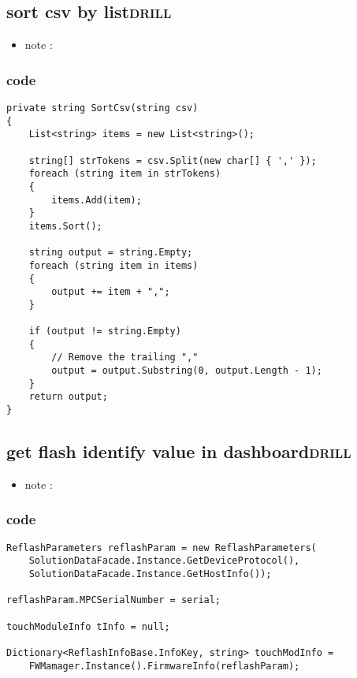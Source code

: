\documentclass[11pt]{article}
\begin{document}
\subsection{sort csv by list\hfill{}\textsc{drill}}
\label{sec:org20635f8}
\begin{itemize}
\item note :
\end{itemize}
\subsubsection{code}
\label{sec:org1c558af}
\begin{verbatim}
private string SortCsv(string csv)
{
    List<string> items = new List<string>();

    string[] strTokens = csv.Split(new char[] { ',' });
    foreach (string item in strTokens)
    {
        items.Add(item);
    }
    items.Sort();

    string output = string.Empty;
    foreach (string item in items)
    {
        output += item + ",";
    }

    if (output != string.Empty)
    {
        // Remove the trailing ","
        output = output.Substring(0, output.Length - 1);
    }
    return output;
}

\end{verbatim}

\subsection{get flash identify value in dashboard\hfill{}\textsc{drill}}
\label{sec:org9cfe80b}
\begin{itemize}
\item note :
\end{itemize}
\subsubsection{code}
\label{sec:orgc8888e0}
\begin{verbatim}
ReflashParameters reflashParam = new ReflashParameters(
    SolutionDataFacade.Instance.GetDeviceProtocol(),
    SolutionDataFacade.Instance.GetHostInfo());

reflashParam.MPCSerialNumber = serial;

touchModuleInfo tInfo = null;

Dictionary<ReflashInfoBase.InfoKey, string> touchModInfo =
    FWMamager.Instance().FirmwareInfo(reflashParam);

\end{verbatim}
\end{document}
